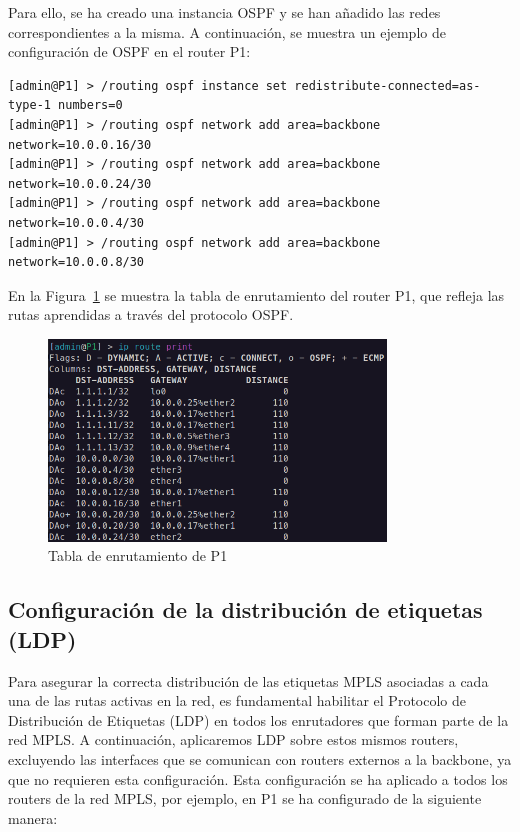 \vspace{0.5cm}  Para ello, se ha creado una instancia OSPF y se
han añadido las redes correspondientes a la misma. A continuación, se muestra
un ejemplo de configuración de OSPF en el router P1:
\begin{lstlisting}[language=RouterOS]
[admin@P1] > /routing ospf instance set redistribute-connected=as-type-1 numbers=0
[admin@P1] > /routing ospf network add area=backbone network=10.0.0.16/30 
[admin@P1] > /routing ospf network add area=backbone network=10.0.0.24/30 
[admin@P1] > /routing ospf network add area=backbone network=10.0.0.4/30 
[admin@P1] > /routing ospf network add area=backbone network=10.0.0.8/30 
\end{lstlisting}

%
En la Figura~\ref{fig:routing_table} se muestra la tabla de enrutamiento del router P1, que refleja las rutas aprendidas a través del protocolo OSPF.

\begin{figure}[H]
	\centering
	\includegraphics[width=0.8\textwidth]{images/routing_table.png}
	\caption{Tabla de enrutamiento de P1}
	\label{fig:routing_table}
\end{figure}

\subsection{Configuración de la distribución de etiquetas (LDP)}
Para asegurar la correcta distribución de las etiquetas MPLS asociadas a cada una
de las rutas activas en la red, es fundamental habilitar el Protocolo de Distribución de Etiquetas (LDP)
en todos los enrutadores que forman parte de la red MPLS. A continuación,
aplicaremos LDP sobre estos mismos routers, excluyendo las interfaces que se comunican
con routers externos a la backbone, ya que no requieren esta configuración. Esta configuración se
ha aplicado a todos los routers de la red MPLS, por ejemplo, en P1 se ha configurado de la siguiente manera:

